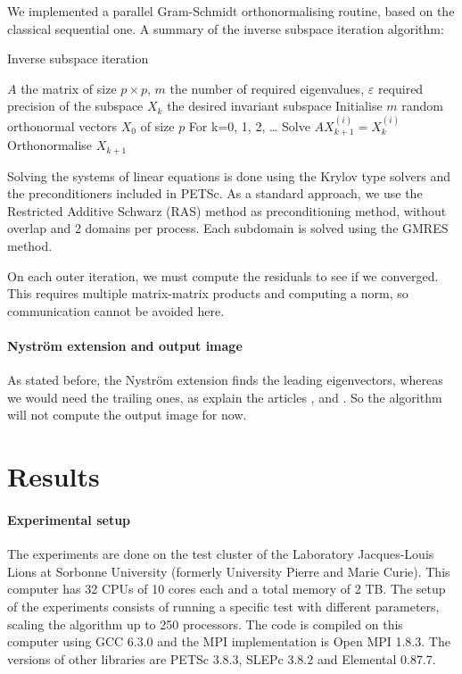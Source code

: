 We implemented a parallel Gram-Schmidt orthonormalising routine, based on the classical sequential one.
A summary of the inverse subspace iteration algorithm:

\begin{algorithm}[H]
 \caption{Inverse subspace iteration}
 \begin{algorithmic}
  \REQUIRE \(A\) the matrix of size \(p \times p\), \(m\) the number of required eigenvalues, \(\varepsilon\) required precision of the subspace
  \ENSURE \(X_k\) the desired invariant subspace
  \STATE Initialise \(m\) random orthonormal vectors \(X_0\) of size \(p\)
  \STATE For k=0, 1, 2, \dots
    \STATE Solve \(A X_{k+1}^{(i)} = X_k^{(i)}\)
   \ENDFOR
   \STATE Orthonormalise \(X_{k+1}\)
  \ENDWHILE
 \end{algorithmic}
\end{algorithm}

Solving the systems of linear equations is done using the Krylov type solvers and the preconditioners included in PETSc.
As a standard approach, we use the Restricted Additive Schwarz (RAS) method as preconditioning method, without overlap and 2 domains per process.
Each subdomain is solved using the GMRES method.

On each outer iteration, we must compute the residuals to see if we converged.
This requires multiple matrix-matrix products and computing a norm, so communication cannot be avoided here.

\paragraph{Nystr\"om extension and output image}
As stated before, the Nystr\"om extension finds the leading eigenvectors, whereas we would need the trailing ones, as explain the articles \cite{belongie_spectral_2002}, \cite{fowlkes_spectral_2004} and \cite{glide_2014}.
So the algorithm will not compute the output image for now.

\section{Results}

\paragraph{Experimental setup}
The experiments are done on the test cluster of the Laboratory Jacques-Louis Lions at Sorbonne University (formerly University Pierre and Marie Curie).
This computer has 32 CPUs of 10 cores each and a total memory of 2 TB.
The setup of the experiments consists of running a specific test with different parameters, scaling the algorithm up to 250 processors.
The code is compiled on this computer using GCC 6.3.0 and the MPI implementation is Open MPI 1.8.3.
The versions of other libraries are PETSc 3.8.3, SLEPc 3.8.2 and Elemental 0.87.7.

